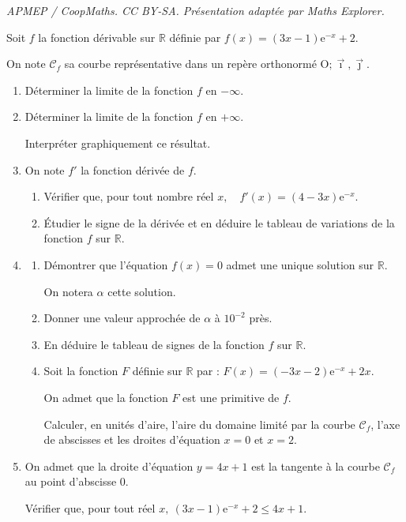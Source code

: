\documentclass[10pt]{article}
\providecommand{\R}{\mathbb{R}}
\providecommand{\e}{{\mathrm{e}}}
\providecommand{\Oij}{\(\mathrm{O};\vec{\imath},\vec{\jmath}\)}
\begin{document}
\noindent\textit{APMEP / CoopMaths. CC BY-SA. Présentation adaptée par Maths Explorer.}\par\medskip
Soit $f$ la fonction dérivable sur $\R$ définie par \quad
$f(x) = (3x- 1)\e^{-x} +2$.

On note $\mathcal{C}_f$ sa courbe représentative dans un repère orthonormé \Oij.


\begin{enumerate}
	\item Déterminer la limite de la fonction $f$ en $- \infty$.
	\item Déterminer la limite de la fonction $f$ en $+ \infty$.

	Interpréter graphiquement ce résultat.
	\item On note $f'$ la fonction dérivée de $f$.
	\begin{enumerate}
		\item Vérifier que, pour tout nombre réel $x,\quad f'(x) = (4 - 3x)\e^{-x}$.
		\item Étudier le signe de la dérivée et en déduire le tableau de variations de la fonction $f$ sur $\R$.
	\end{enumerate}
	\item \begin{enumerate}
		\item Démontrer que l'équation $f(x) = 0$ admet une unique solution sur $\R$.

		On notera $\alpha$ cette solution.

		\item Donner une valeur approchée de $\alpha$ à $10^{-2}$  près.
		\item En déduire le tableau de signes de la fonction $f$ sur $\R$.
		\item Soit la fonction $F$ définie sur $\R$ par : $F(x) =(- 3x - 2)\e^{-x} + 2x$.

		On admet que la fonction $F$ est une primitive de $f$.

		Calculer, en unités d'aire, l'aire du domaine limité par la courbe $\mathcal{C}_f$, l'axe de
		abscisses et les droites d'équation $x = 0$ et $x = 2$.
	\end{enumerate}
	\item  On admet que la droite d'équation $y = 4x + 1$ est la tangente à la courbe $\mathcal{C}_f$ au point d'abscisse 0.

	Vérifier que, pour tout réel $x,\: (3x - 1)\e^{-x} + 2 \leqslant 4x + 1$.
\end{enumerate}
\end{document}
